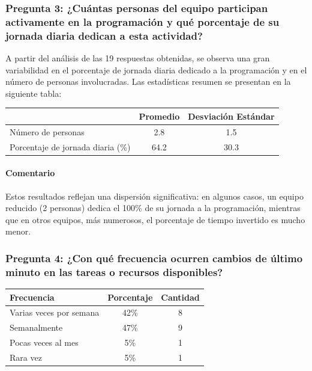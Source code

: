 \documentclass{article}
\begin{document}
\begin{appendix}
    \vspace{1.5em}
    \subsubsection*{Pregunta 3: ¿Cuántas personas del equipo participan activamente en la programación y qué porcentaje de su jornada diaria dedican a esta actividad?}
    
    A partir del análisis de las 19 respuestas obtenidas, se observa una gran variabilidad en el porcentaje de jornada diaria dedicado a la programación y en el número de personas involucradas. Las estadísticas resumen se presentan en la siguiente tabla:
    
    \begin{table}[H]
        \centering
        \begin{tabular}{lcc}
            \toprule
            & \textbf{Promedio} & \textbf{Desviación Estándar} \\
            \midrule
            Número de personas & 2.8 & 1.5 \\
            Porcentaje de jornada diaria (\%) & 64.2 & 30.3 \\
            \bottomrule
        \end{tabular}
        \label{tab:estadisticas_resumen_jornada}
    \end{table}
    
    \paragraph{Comentario} Estos resultados reflejan una dispersión significativa: en algunos casos, un equipo reducido (2 personas) dedica el 100\% de su jornada a la programación, mientras que en otros equipos, más numerosos, el porcentaje de tiempo invertido es mucho menor.
    
    
    \vspace{1.5em}
    \subsubsection*{Pregunta 4: ¿Con qué frecuencia ocurren cambios de último minuto en las tareas o recursos disponibles?}
    
    \begin{table}[H]
        \centering
        \begin{tabular}{lcc}
            \toprule
            \textbf{Frecuencia} & \textbf{Porcentaje} & \textbf{Cantidad} \\
            \midrule
            Varias veces por semana & 42\% & 8 \\
            Semanalmente & 47\% & 9 \\
            Pocas veces al mes & 5\% & 1 \\
            Rara vez & 5\% & 1 \\
            \bottomrule
        \end{tabular}
        \label{tab:cambios_ultimo_minuto}
    \end{table}
    

\end{appendix}
\end{document}
